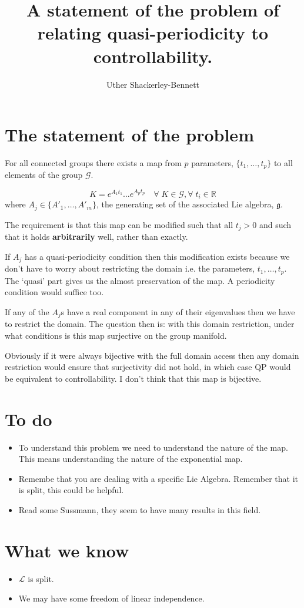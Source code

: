 


\title{A statement of the problem of relating quasi-periodicity to controllability.}
\author{Uther Shackerley-Bennett}
\maketitle

\section{The statement of the problem}
For all connected groups there exists a map from $p$ parameters, $\{t_1,\ldots,t_p\}$ to all elements of the group $\mathcal{G}$.

\begin{equation}
K = e^{A_1t_1}\ldots e^{A_pt_p} \quad \forall \; K \in \mathcal{G}, \forall \; t_i \in \mathbb{R}
\end{equation}
where $A_j \in \{A'_1,\ldots,A'_m\}$, the generating set of the associated Lie algebra, $\mathfrak{g}$.

The requirement is that this map can be modified such that all $t_j > 0$ and such that it holds \textbf{arbitrarily} well, rather than exactly.

If $A_j$ has a quasi-periodicity condition then this modification exists because we don't have to worry about restricting the domain i.e. the parameters, $t_1,\ldots,t_p$. The `quasi' part gives us the almost preservation of the map. A periodicity condition would suffice too.

If any of the $A_j$s have a real component in any of their eigenvalues then we have to restrict the domain. The question then is: with this domain restriction, under what conditions is this map surjective on the group manifold.

Obviously if it were always bijective with the full domain access then any domain restriction would ensure that surjectivity did not hold, in which case QP would be equivalent to controllability. I don't think that this map is bijective.

\section{To do}
\begin{itemize}
\item To understand this problem we need to understand the nature of the map. This means understanding the nature of the exponential map. 
\item Remembe that you are dealing with a specific Lie Algebra. Remember that it is split, this could be helpful.
\item Read some Sussmann, they seem to have many results in this field.
\end{itemize}

\section{What we know}
\begin{itemize}
\item $\mathcal{L}$ is split.
\item We may have some freedom of linear independence.
\end{itemize}


